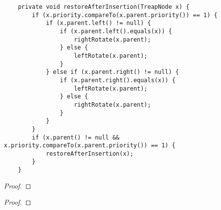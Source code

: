 \documentclass[12pt]{article}
\newenvironment{problem}[2][Problem]{\begin{trivlist}
\item[\hskip \labelsep {\bfseries #1}\hskip \labelsep {\bfseries #2.}]}{\end{trivlist}}
\begin{document}
\begin{problem}{3}
\begin{verbatim}
    private void restoreAfterInsertion(TreapNode x) {
        if (x.priority.compareTo(x.parent.priority()) == 1) {
            if (x.parent.left() != null) {
                if (x.parent.left().equals(x)) {
                    rightRotate(x.parent);
                } else {
                    leftRotate(x.parent);
                }
            } else if (x.parent.right() != null) {
                if (x.parent.right().equals(x)) {
                    leftRotate(x.parent);
                } else {
                    rightRotate(x.parent);
                }
            }
        }
        if (x.parent() != null && x.priority.compareTo(x.parent.priority()) == 1) {
            restoreAfterInsertion(x);
        }
    }
\end{verbatim}
\end{problem}

\begin{proof}

\end{proof}



\begin{problem}{4}

\end{problem}

\begin{proof}

\end{proof}
\end{document}
